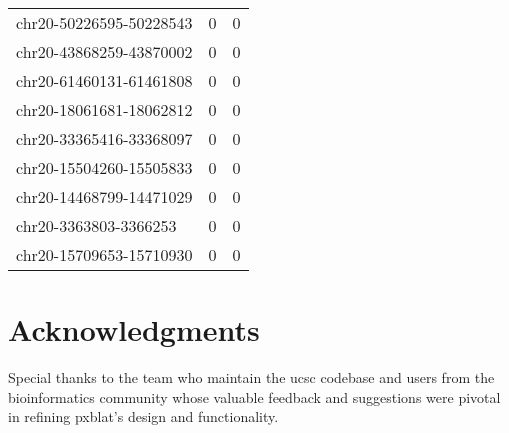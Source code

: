 \documentclass[10pt,letterpaper]{article}
\begin{document}
{\begin{longtable}{lSS}
	chr20-50226595-50228543 & 0      & 0                     \\
	chr20-43868259-43870002 & 0      & 0                     \\
	chr20-61460131-61461808 & 0      & 0                     \\
	chr20-18061681-18062812 & 0      & 0                     \\
	chr20-33365416-33368097 & 0      & 0                     \\
	chr20-15504260-15505833 & 0      & 0                     \\
	chr20-14468799-14471029 & 0      & 0                     \\
	chr20-3363803-3366253   & 0      & 0                     \\
	chr20-15709653-15710930 & 0      & 0                     \\
\end{longtable}



\section*{Acknowledgments}

Special thanks to the team who maintain the \gls{ucsc} codebase and users from the bioinformatics community whose valuable feedback and suggestions were pivotal in refining \gls{pxblat}'s design and functionality.

\nolinenumbers

%
%
%
%
%
%
%

}
\end{document}
